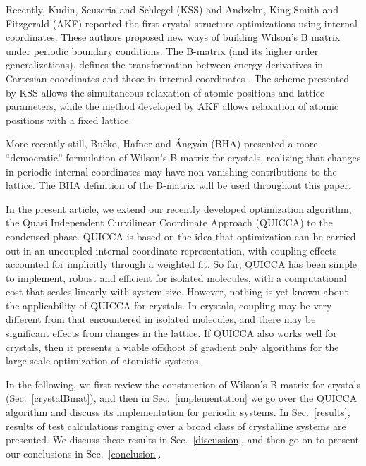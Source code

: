 \twolinestyle{\documentclass[prb,preprint]{revtex4}}
\begin{document}
Recently, Kudin, Scuseria and Schlegel (KSS) \cite{KKudin01} and Andzelm, King-Smith and Fitzgerald (AKF) 
\cite{JAndzelm01}
reported the first crystal structure optimizations using internal coordinates.
These authors proposed new ways of building Wilson's B matrix \cite{EWilson55} 
under periodic boundary conditions.  The B-matrix (and its higher order generalizations), 
defines the transformation between energy derivatives in Cartesian coordinates and those 
in internal coordinates \cite{EWilson55,MChallacombe91}. 
The scheme presented by KSS allows the simultaneous relaxation of atomic positions and lattice parameters,
while the method developed by AKF allows relaxation of atomic positions with a fixed lattice.

More recently still, Bu\v{c}ko, Hafner and {\'A}ngy{\'a}n (BHA) \cite{TBucko05}
presented a more ``democratic'' formulation of Wilson's B matrix for crystals, 
realizing that changes in periodic internal coordinates may have non-vanishing 
contributions to the lattice.  The BHA definition of the B-matrix will be used 
throughout this paper. 

In the present article, we extend our recently developed optimization algorithm, 
the Quasi Independent Curvilinear Coordinate Approach (QUICCA) \cite{KNemeth04} 
to the condensed phase.  QUICCA is based on the idea  that optimization 
can be carried out in an uncoupled internal coordinate representation, with coupling 
effects accounted for implicitly through a weighted fit. So far,
QUICCA has been simple to implement, robust and efficient for isolated 
molecules, with a computational cost that scales linearly with system size.
However, nothing is yet known about the applicability of QUICCA for crystals. 
In crystals, coupling  may be very different from that encountered in isolated 
molecules, and there may be significant effects from changes in the lattice.
If QUICCA also works well for crystals, then it presents a viable offshoot 
of gradient only algorithms for the large scale optimization of atomistic 
systems. 

In the following, we first review the construction of Wilson's B matrix
for crystals (Sec.~\ref{crystalBmat}), and then in Sec.~\ref{implementation}
we go over the QUICCA algorithm  and discuss its implementation for 
periodic systems.  In Sec.~\ref{results}, results of test calculations 
ranging over a broad class of crystalline systems are presented.
We discuss these results in Sec.~\ref{discussion}, and then go on to 
present our conclusions in Sec.~\ref{conclusion}.
\end{document}
